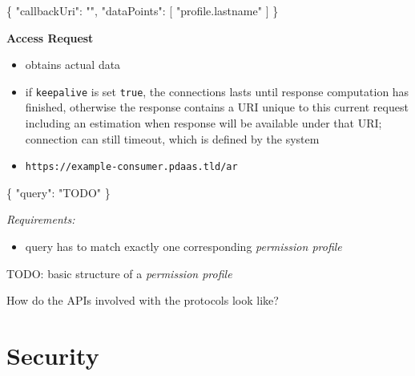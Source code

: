\documentclass[12pt,english,a4paper,titlepage,cleardoublepage=empty,dottedtoc]{report}
\newenvironment{Shaded}{}{}
\newcommand{\DataTypeTok}[1]{\textcolor[rgb]{0.56,0.13,0.00}{{#1}}}
\newcommand{\StringTok}[1]{\textcolor[rgb]{0.25,0.44,0.63}{{#1}}}
\newcommand{\OtherTok}[1]{\textcolor[rgb]{0.00,0.44,0.13}{{#1}}}
\newcommand{\FunctionTok}[1]{\textcolor[rgb]{0.02,0.16,0.49}{{#1}}}
\providecommand{\tightlist}{%
  \setlength{\itemsep}{0pt}\setlength{\parskip}{0pt}}
\begin{document}
\begin{Shaded}
\begin{Highlighting}[]
\FunctionTok{\{}
    \DataTypeTok{"callbackUri"}\FunctionTok{:} \StringTok{""}\FunctionTok{,}
    \DataTypeTok{"dataPoints"}\FunctionTok{:} \OtherTok{[}
        \StringTok{"profile.lastname"}
    \OtherTok{]}
\FunctionTok{\}}
\end{Highlighting}
\end{Shaded}

\textbf{Access Request}

\begin{itemize}
\tightlist
\item
  obtains actual data
\item
  if \texttt{keepalive} is set \texttt{true}, the connections lasts
  until response computation has finished, otherwise the response
  contains a URI unique to this current request including an estimation
  when response will be available under that URI; connection can still
  timeout, which is defined by the system
\item
  \texttt{https://example-consumer.pdaas.tld/ar}
\end{itemize}

\begin{Shaded}
\begin{Highlighting}[]
\FunctionTok{\{}
    \DataTypeTok{"query"}\FunctionTok{:} \StringTok{"TODO"}
\FunctionTok{\}}
\end{Highlighting}
\end{Shaded}

\emph{Requirements:}

\begin{itemize}
\tightlist
\item
  query has to match exactly one corresponding \emph{permission profile}
\end{itemize}

TODO: basic structure of a \emph{permission profile}

How do the APIs involved with the protocols look like?

\section{Security}\label{security}
\end{document}
